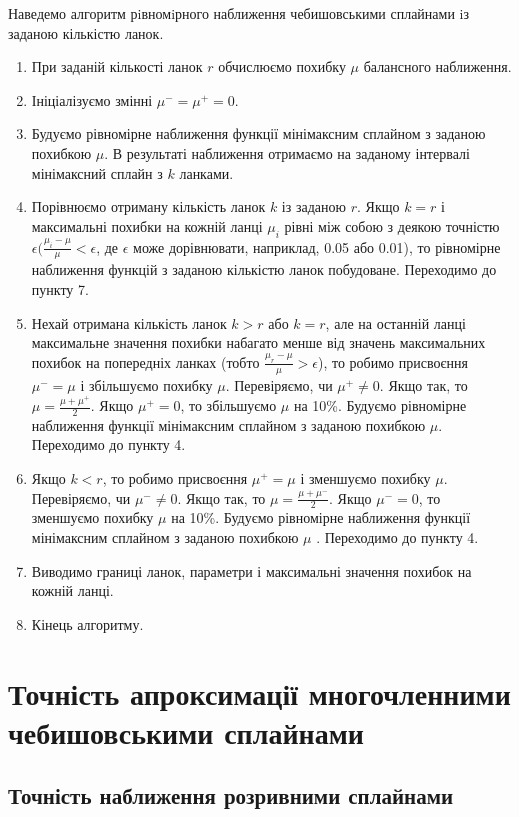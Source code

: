 \documentclass[ukrainian,14pt]{extarticle}
\begin{document}
\newpage
Наведемо алгоритм рiвномiрного наближення чебишовськими сплайнами iз заданою кількістю ланок.
\begin{enumerate}
    \item При заданій кількості ланок $r$ обчислюємо похибку $\mu$ балансного наближення.
    \item Ініціалізуємо змінні $\mu^{-} = \mu^{+} = 0$.
    \item 	Будуємо рівномірне наближення функції мінімаксним сплайном з заданою похибкою $\mu$. В результаті наближення отримаємо на заданому інтервалі мінімаксний сплайн з $k$ ланками.
    \item Порівнюємо отриману кількість ланок $k$ із заданою $r$. Якщо $k = r$ і максимальні похибки на кожній ланці $\mu_i$ рівні між собою з деякою точністю $\epsilon (\frac{\mu_i - \mu}{\mu} < \epsilon$, де $\epsilon$ може дорівнювати, наприклад, 0.05 або 0.01), то рівномірне наближення функцій з заданою кількістю ланок побудоване. Переходимо до пункту 7.
    \item Нехай отримана кількість ланок $k > r$ або $k = r$, але на останній ланці максимальне значення похибки набагато менше від значень максимальних похибок на попередніх ланках (тобто $\frac{\mu_r - \mu}{\mu} > \epsilon$), то робимо присвоєння $\mu^- = \mu$ і збільшуємо похибку $\mu$. Перевіряємо, чи $\mu^+ \neq 0$. Якщо так, то $\mu = \frac{\mu + \mu^+}{2}$. Якщо $\mu^+ = 0$, то збільшуємо $\mu$ на 10\%. Будуємо рівномірне наближення функції мінімаксним сплайном з заданою похибкою $\mu$. Переходимо до пункту 4.
    \item Якщо $k < r$, то робимо присвоєння $\mu^+ = \mu$ і зменшуємо похибку $\mu$. Перевіряємо, чи $\mu^- \neq 0$. Якщо так, то $\mu = \frac{\mu + \mu^-}{2}$. Якщо $\mu^- = 0$, то зменшуємо похибку $\mu$ на 10\%. Будуємо рівномірне наближення функції мінімаксним сплайном з заданою похибкою $\mu$ . Переходимо до пункту 4.
    \item Виводимо границі ланок, параметри і максимальні значення похибок на кожній ланці.
    \item Кінець алгоритму.
\end{enumerate}

\newpage

\section{Точність апроксимації многочленними чебишовськими сплайнами}

\subsection{Точність наближення розривними сплайнами}
\end{document}
